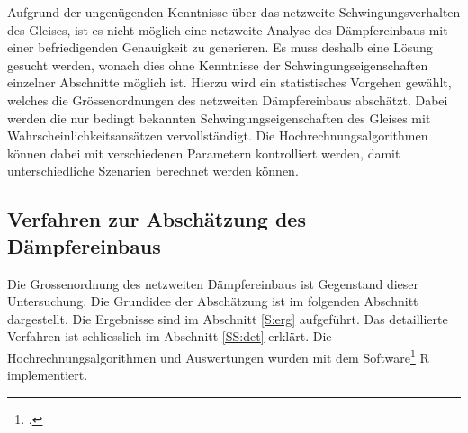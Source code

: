 Aufgrund der ungenügenden Kenntnisse über das netzweite Schwingungsverhalten des Gleises, ist es nicht möglich eine netzweite Analyse des Dämpfereinbaus  mit einer befriedigenden Genauigkeit zu generieren. Es muss deshalb eine Lösung gesucht werden, wonach dies ohne Kenntnisse der Schwingungseigenschaften einzelner Abschnitte möglich ist. Hierzu wird ein statistisches Vorgehen gewählt, welches die Grössenordnungen des netzweiten Dämpfereinbaus abschätzt. Dabei werden die nur bedingt bekannten Schwingungseigenschaften des Gleises mit Wahrscheinlichkeitsansätzen vervollständigt. Die Hochrechnungsalgorithmen können dabei mit verschiedenen Parametern kontrolliert werden, damit unterschiedliche Szenarien berechnet werden können.

\subsection{Verfahren zur Abschätzung des Dämpfereinbaus}
 Die Grossenordnung des netzweiten Dämpfereinbaus ist Gegenstand dieser Untersuchung. Die Grundidee der Abschätzung ist im folgenden Abschnitt dargestellt. Die Ergebnisse sind im  Abschnitt \ref{S:erg} aufgeführt. Das detaillierte Verfahren ist schliesslich im Abschnitt \ref{SS:det} erklärt. Die Hochrechnungsalgorithmen und Auswertungen wurden mit dem Software\footcite{R} R  implementiert.
